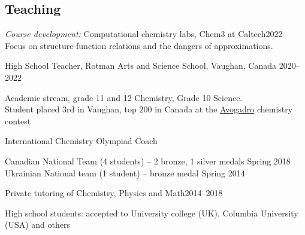 \documentclass[margin,line]{res}
\newenvironment{list1}{
  \begin{list}{\ding{113}}{%
      \setlength{\itemsep}{0in}
      \setlength{\parsep}{0in} \setlength{\parskip}{0in}
      \setlength{\topsep}{0in} \setlength{\partopsep}{0in} 
      \setlength{\leftmargin}{0.17in}}}{\end{list}}
\begin{document}
\newpage

\pagestyle{headings}


\begin{resume}
\section{\sc Teaching}
{\em Course development:} Computational chemistry labs, Chem3 at Caltech\hfill{2022}\\
Focus on structure-function relations and the dangers of approximations.

\vspace{-0.3cm}

High School Teacher, Rotman Arts and Science School, Vaughan, Canada \hfill{2020--2022}

\begin{list1}

\item[] Academic stream, grade 11 and 12 Chemistry, Grade 10 Science. \\
Student placed 3rd in Vaughan, top 200 in Canada at the \href{https://uwaterloo.ca/chemistry/community-outreach/chemistry-high-school-exams}{Avogadro} chemistry contest
\end{list1}

\vspace{-0.3cm}

International Chemistry Olympiad Coach
\begin{list1}
\item[]Canadian National  Team (4 students) -- 2 bronze, 1 silver medals \hfill{Spring 2018}\\
Ukrainian National team (1 student) -- bronze medal \hfill{Spring 2014}
\end{list1}

\vspace{-0.3cm}

Private tutoring of Chemistry, Physics and Math\hfill{2014--2018}

\begin{list1}
\item[]High school students: accepted to University college (UK), Columbia University (USA) and others
\end{list1}


\end{resume}
\end{document}
